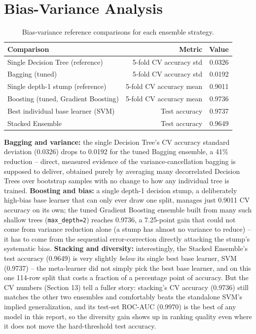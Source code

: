 \documentclass[11pt,a4paper]{article}
\begin{document}
\section{Bias-Variance Analysis}
\begin{table}[h]
\centering
\begin{tabular}{@{}lrr@{}}
\toprule
Comparison & Metric & Value \\
\midrule
Single Decision Tree (reference) & 5-fold CV accuracy std & 0.0326 \\
Bagging (tuned) & 5-fold CV accuracy std & 0.0192 \\
Single depth-1 stump (reference) & 5-fold CV accuracy mean & 0.9011 \\
Boosting (tuned, Gradient Boosting) & 5-fold CV accuracy mean & 0.9736 \\
Best individual base learner (SVM) & Test accuracy & 0.9737 \\
Stacked Ensemble & Test accuracy & 0.9649 \\
\bottomrule
\end{tabular}
\caption{Bias-variance reference comparisons for each ensemble strategy.}
\end{table}
\textbf{Bagging and variance:} the single Decision Tree's CV accuracy standard deviation (0.0326) drops to 0.0192 for the tuned Bagging ensemble, a 41\% reduction -- direct, measured evidence of the variance-cancellation bagging is supposed to deliver, obtained purely by averaging many decorrelated Decision Trees over bootstrap samples with no change to how any individual tree is trained.
\textbf{Boosting and bias:} a single depth-1 decision stump, a deliberately high-bias base learner that can only ever draw one split, manages just 0.9011 CV accuracy on its own; the tuned Gradient Boosting ensemble built from many such shallow trees (\texttt{max\_depth=2}) reaches 0.9736, a 7.25-point gain that could not come from variance reduction alone (a stump has almost no variance to reduce) -- it has to come from the sequential error-correction directly attacking the stump's systematic bias.
\textbf{Stacking and diversity:} interestingly, the Stacked Ensemble's test accuracy (0.9649) is very slightly \emph{below} its single best base learner, SVM (0.9737) -- the meta-learner did not simply pick the best base learner, and on this one 114-row split that costs a fraction of a percentage point of accuracy. But the CV numbers (Section 13) tell a fuller story: stacking's CV accuracy (0.9736) still matches the other two ensembles and comfortably beats the standalone SVM's implied generalization, and its test-set ROC-AUC (0.9970) is the best of any model in this report, so the diversity gain shows up in ranking quality even where it does not move the hard-threshold test accuracy.
\end{document}
